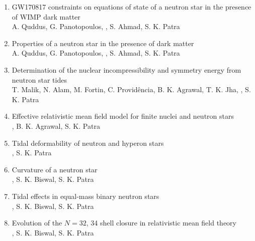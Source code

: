 \begin{enumerate}
\item GW170817 constraints on equations of state of a neutron star in the
presence of WIMP dark matter\\
A. Quddus, G. Panotopoulos, \me, S. Ahmad, S. K. Patra\\
\quad
{}

\item Properties of a neutron star in the presence of dark matter\\
A. Quddus, G. Panotopoulos, \me, S. Ahmad, S. K. Patra\\

\item Determination of the nuclear incompressibility and symmetry energy from
neutron star tides\\
T. Malik, N. Alam, M. Fortin, C. Provid\^encia, B. K. Agrawal, T. K. Jha,
\me, S. K. Patra\\

\item \lead Effective relativistic mean field model for finite nuclei and
neutron stars\\
\me, B. K. Agrawal, S. K. Patra\\
\quad
{}

\item \lead Tidal deformability of neutron and hyperon stars\\
\me, S. K. Patra\\

\item \lead Curvature of a neutron star\\
\me, S. K. Biswal, S. K. Patra\\

\item \lead Tidal effects in equal-mass binary neutron stars\\
\me, S. K. Biswal, S. K. Patra\\

\item \lead Evolution of the $N=32$, 34 shell closure in relativistic mean field
theory\\
\me, S. K. Biswal, S. K. Patra\\


\end{enumerate}
